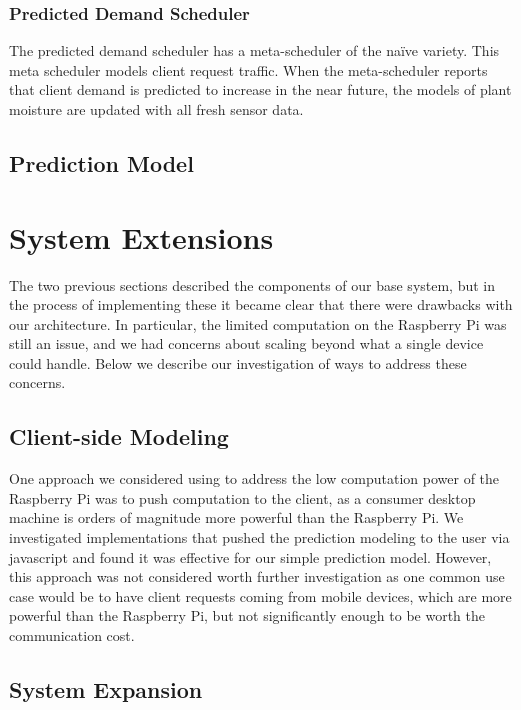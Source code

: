 \documentclass[a4paper]{acm_proc_article-sp}
\makeatletter
\newcommand{\naive}{na\"{i}ve\@\xspace}
\makeatother
\begin{document}
\subsubsection{Predicted Demand Scheduler}

The predicted demand scheduler has a meta-scheduler of the \naive variety.  This meta scheduler models client request traffic.  When the meta-scheduler reports that client demand is predicted to increase in the near future, the models of plant moisture are updated with all fresh sensor data.

\subsection{Prediction Model}

\section{System Extensions}

The two previous sections described the components of our base system, but in the process of implementing these it became clear that there were drawbacks with our architecture.  In particular, the limited computation on the Raspberry Pi was still an issue, and we had concerns about scaling beyond what a single device could handle.  Below we describe our investigation of ways to address these concerns.

\subsection{Client-side Modeling}

One approach we considered using to address the low computation power of the Raspberry Pi was to push computation to the client, as a consumer desktop machine is orders of magnitude more powerful than the Raspberry Pi.  We investigated implementations that pushed the prediction modeling to the user via javascript and found it was effective for our simple prediction model.  However, this approach was not considered worth further investigation as one common use case would be to have client requests coming from mobile devices, which are more powerful than the Raspberry Pi, but not significantly enough to be worth the communication cost.

\subsection{System Expansion}
\end{document}
